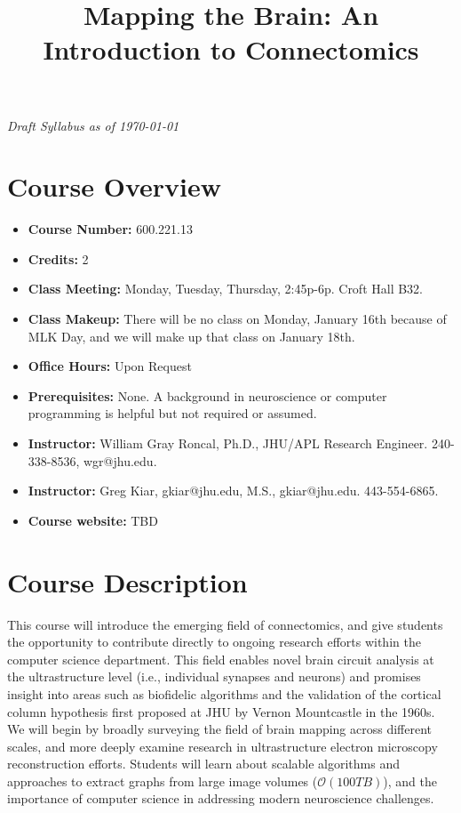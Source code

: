 \documentclass[12pt]{article}
\title{Mapping the Brain:  An Introduction to Connectomics}
\date{}
\begin{document}
\vspace{-0.5cm}
\maketitle
\vspace{-2cm}
\begin{center}\textit{Draft Syllabus as of \today}\end{center}

\section*{Course Overview}
\begin{itemize}[noitemsep]
\item{\textbf{Course Number:}  600.221.13}
\item{\textbf{Credits:} 2 }
\item{\textbf{Class Meeting:}  Monday, Tuesday, Thursday, 2:45p-6p. Croft Hall	B32.}
\item{\textbf{Class Makeup:} There will be no class on Monday, January 16th because of MLK Day, and we will make up that class on January 18th.}
\item{\textbf{Office Hours:}  Upon Request}
\item{\textbf{Prerequisites:} None.  A background in neuroscience or computer programming is helpful but not required or assumed.}
\item{\textbf{Instructor:}  William Gray Roncal, Ph.D., JHU/APL Research Engineer.  240-338-8536, wgr@jhu.edu.}
\item{\textbf{Instructor:}  Greg Kiar, gkiar@jhu.edu, M.S., gkiar@jhu.edu.  443-554-6865.}
\item{\textbf{Course website:}  TBD  }
\end{itemize}

\section*{Course Description} 
This course will introduce the emerging field of connectomics, and give students the opportunity to contribute directly to ongoing research efforts within the computer science department.  This field enables novel brain circuit analysis at the ultrastructure level (i.e., individual synapses and neurons) and promises insight into areas such as biofidelic algorithms and the validation of the cortical column hypothesis first proposed at JHU by Vernon Mountcastle in the 1960s.  We will begin by broadly surveying the field of brain mapping across  different scales, and more deeply examine research in ultrastructure electron microscopy reconstruction efforts.  Students will learn about scalable algorithms and approaches to extract graphs from large image volumes ($\mathcal{O}(100 TB)$), and the importance of computer science in addressing modern neuroscience challenges.  
\end{document}
